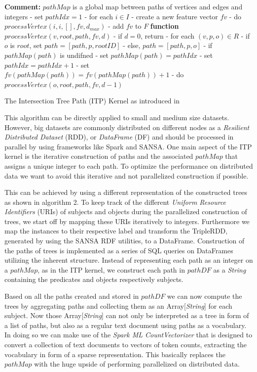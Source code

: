 \documentclass{easychair}
\begin{document}
\begin{algorithm}
 \label{alg:ITP}
 \textbf{Comment:} $pathMap$ is a global map between paths of vertices and edges and integers\;
 \;
 - set $pathIdx = 1$\;
 - for each $i \in I$\; \Indp
 - create a new feature vector $fv$\;
 - do $processVertex(i,i,[],fv,d_{max})$\;
 - add $fv$ to $F$\; \Indm
 \;
 \textbf{function} $processVertex(v,root,path,fv,d)$\; \Indp
 - if $d = 0$, return \;
 - for each $(v,p,o) \in R$\; \Indp
 - if $o$ is $root$, set $path = [path,p,rootID]$\;
 - else, $path = [path, p, o]$\;
 - if $pathMap(path)$ is undifned\; \Indp
 - set $pathMap(path) = pathIdx$
 - set$pathIdx = pathIdx + 1$\; \Indm
 - set $fv(pathMap(path)) = fv(pathMap(path)) + 1$\;
 - do $processVertex(o,root,path,fv,d-1)$\;
\caption{The Intersection Tree Path (ITP) Kernel as introduced in \cite{FGK}}
\end{algorithm}

This algorithm can be directly applied to small and medium size datasets. However, big datasets are commonly distributed on different nodes as a \textit{Resilient Distributed Dataset} (RDD), or \textit{DataFrame} (DF) \cite{RDDpaper} and should be processed in parallel by using frameworks like Spark and SANSA. One main aspect of the ITP kernel is the iterative construction of paths and the associated $pathMap$ that assigns a unique integer to each path. To optimize the performance on distributed data we want to avoid this iterative and not parallelized construction if possible.

This can be achieved by using a different representation of the constructed trees as shown in algorithm 2. To keep track of the different \textit{Uniform Resource Identifiers} (URIs) of subjects and objects during the parallelized construction of trees, we start off by mapping these URIs iteratively to integers. Furthermore we map the instances to their respective label and transform the TripleRDD, generated by using the SANSA RDF utilities, to a DataFrame. Construction of the paths of trees is implemented as a series of SQL queries on DataFrames utilizing the inherent structure. Instead of representing each path as an integer on a $pathMap$, as in the ITP kernel, we construct each path in $pathDF$ as a \textit{String} containing the predicates and objects respectively subjects.

Based on all the paths created and stored in $pathDF$ we can now compute the trees by aggregating paths and collecting them as an Array[\textit{String}] for each subject. Now those Array[\textit{String}] can not only be interpreted as a tree in form of a list of paths, but also as a regular text document using paths as a vocabulary.  In doing so we can make use of the \textit{Spark ML CountVectorizer} that is designed to convert a collection of text documents to vectors of token counts, extracting the vocabulary in form of a sparse representation. This basically replaces the $pathMap$ with the huge upside of performing parallelized on distributed data. 
\end{document}
